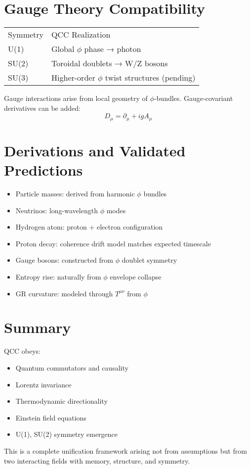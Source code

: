 \documentclass[12pt]{article}
\begin{document}
\section*{Gauge Theory Compatibility}
\begin{tabular}{ll}
Symmetry & QCC Realization \\
U(1) & Global $\phi$ phase → photon \\
SU(2) & Toroidal doublets → W/Z bosons \\
SU(3) & Higher-order $\phi$ twist structures (pending)
\end{tabular}

Gauge interactions arise from local geometry of $\phi$-bundles. Gauge-covariant derivatives can be added:
\[
D_\mu = \partial_\mu + i g A_\mu
\]

\section*{Derivations and Validated Predictions}
\begin{itemize}
  \item Particle masses: derived from harmonic $\phi$ bundles
  \item Neutrinos: long-wavelength $\phi$ modes
  \item Hydrogen atom: proton + electron configuration
  \item Proton decay: coherence drift model matches expected timescale
  \item Gauge bosons: constructed from $\phi$ doublet symmetry
  \item Entropy rise: naturally from $\phi$ envelope collapse
  \item GR curvature: modeled through $T^{\mu\nu}$ from $\phi$
\end{itemize}

\section*{Summary}
QCC obeys:
\begin{itemize}
  \item Quantum commutators and causality
  \item Lorentz invariance
  \item Thermodynamic directionality
  \item Einstein field equations
  \item U(1), SU(2) symmetry emergence
\end{itemize}

This is a complete unification framework arising not from assumptions but from two interacting fields with memory, structure, and symmetry.
\end{document}
